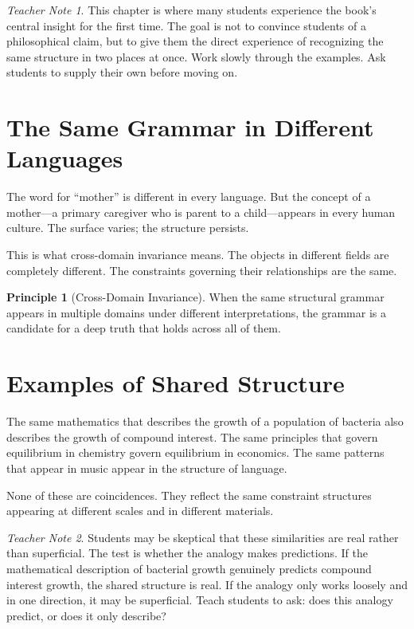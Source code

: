 \documentclass[11pt]{book}
\theoremstyle{definition}
\newtheorem{principle}[definition]{Principle}
\theoremstyle{remark}
\newtheorem{teachernote}{Teacher Note}[chapter]
\begin{document}
\begin{teachernote}
This chapter is where many students experience the book's central
insight for the first time. The goal is not to convince students of a
philosophical claim, but to give them the direct experience of
recognizing the same structure in two places at once. Work slowly
through the examples. Ask students to supply their own before moving on.
\end{teachernote}

\section{The Same Grammar in Different Languages}

The word for ``mother'' is different in every language. But the concept
of a mother---a primary caregiver who is parent to a child---appears in
every human culture. The surface varies; the structure persists.

This is what cross-domain invariance means. The objects in different fields
are completely different. The constraints governing their relationships are
the same.

\begin{principle}[Cross-Domain Invariance]
When the same structural grammar appears in multiple domains under different
interpretations, the grammar is a candidate for a deep truth that holds
across all of them.
\end{principle}

\section{Examples of Shared Structure}

The same mathematics that describes the growth of a population of bacteria
also describes the growth of compound interest. The same principles that
govern equilibrium in chemistry govern equilibrium in economics. The same
patterns that appear in music appear in the structure of language.

None of these are coincidences. They reflect the same constraint structures
appearing at different scales and in different materials.

\begin{teachernote}
Students may be skeptical that these similarities are real rather than
superficial. The test is whether the analogy makes predictions. If the
mathematical description of bacterial growth genuinely predicts compound
interest growth, the shared structure is real. If the analogy only
works loosely and in one direction, it may be superficial. Teach
students to ask: does this analogy predict, or does it only describe?
\end{teachernote}
\end{document}
